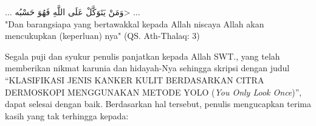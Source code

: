 \documentclass[]{mathuinsa}
\begin{document}
    \cover\titlepage

    \approvalpageBeforeExam
    \approvalpage
    \declarepage


    \motto


    \begin{center}
        $\ldots$ \<وَمَنْ يَتَوَكَّلْ عَلَى اللَّهِ فَهُوَ حَسْبُه> $\ldots$ \\
        {"}Dan barangsiapa yang bertawakkal kepada Allah niscaya Allah akan mencukupkan (keperluan) nya{"}
        (QS. Ath-Thalaq: 3)
    \end{center}


    \acknowledment
    \begin{center}
        \emph{}
    \end{center}

    \preface
    Segala puji dan syukur penulis panjatkan kepada Allah SWT., yang telah memberikan nikmat karunia dan hidayah-Nya sehingga skripsi dengan judul “KLASIFIKASI JENIS KANKER KULIT BERDASARKAN CITRA DERMOSKOPI MENGGUNAKAN METODE YOLO (\textit{You Only Look Once})”, dapat selesai dengan baik. Berdasarkan hal tersebut, penulis mengucapkan terima kasih yang tak terhingga kepada:
\end{document}
